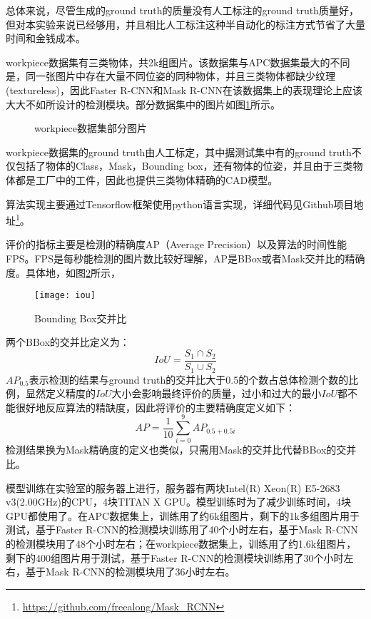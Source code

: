 总体来说，尽管生成的ground truth的质量没有人工标注的ground truth质量好，但对本实验来说已经够用，并且相比人工标注这种半自动化的标注方式节省了大量时间和金钱成本。

workpiece数据集有三类物体，共2k组图片。该数据集与APC数据集最大的不同是，同一张图片中存在大量不同位姿的同种物体，并且三类物体都缺少纹理(textureless)，因此Faster R-CNN和Mask R-CNN在该数据集上的表现理论上应该大大不如所设计的检测模块。部分数据集中的图片如图\ref{fig:wp_dataset}所示。
\begin{figure}[ht]
  \centering
  \hskip0.2cm
  \hskip0.2cm
  \vfill
  \hskip0.2cm
  \hskip0.2cm
  \caption{workpiece数据集部分图片}
  \label{fig:wp_dataset}
\end{figure}
workpiece数据集的ground truth由人工标定，其中据测试集中有的ground truth不仅包括了物体的Class，Mask，Bounding box，还有物体的位姿，并且由于三类物体都是工厂中的工件，因此也提供三类物体精确的CAD模型。

{\kai 算法实现}主要通过Tensorflow框架使用python语言实现，详细代码见Github项目地址\footnote{\url{https://github.com/freealong/Mask\_RCNN}}。

{\kai 评价的指标}主要是检测的精确度AP（Average Precision）以及算法的时间性能FPS。FPS是每秒能检测的图片数比较好理解，AP是BBox或者Mask交并比的精确度。具体地，如图\ref{fig:iou}所示，
\begin{figure}[ht]
  \centering
  \texttt{[image: iou]}
  \caption{Bounding Box交并比}
  \label{fig:iou}
\end{figure}
两个BBox的交并比定义为：
\begin{equation}
  IoU = \frac{S_1\cap S_2}{S_1\cup S_2}
\end{equation}
$AP_{0.5}$表示检测的结果与ground truth的交并比大于0.5的个数占总体检测个数的比例，显然定义精度的$IoU$大小会影响最终评价的质量，过小和过大的最小$IoU$都不能很好地反应算法的精缺度，因此将评价的主要精确度定义如下：
\begin{equation}
  AP = \frac{1}{10}\sum_{i=0}^{9}{AP_{0.5 + 0.5i}}
\end{equation}
检测结果换为Mask精确度的定义也类似，只需用Mask的交并比代替BBox的交并比。

{\kai 模型训练}在实验室的服务器上进行，服务器有两块Intel(R) Xeon(R) E5-2683 v3(2.00GHz)的CPU，4块TITAN X GPU。模型训练时为了减少训练时间，4块GPU都使用了。在APC数据集上，训练用了约6k组图片，剩下的1k多组图片用于测试，基于Faster R-CNN的检测模块训练用了40个小时左右，基于Mask R-CNN的检测模块用了48个小时左右；在workpiece数据集上，训练用了约1.6k组图片，剩下的400组图片用于测试，基于Faster R-CNN的检测模块训练用了30个小时左右，基于Mask R-CNN的检测模块用了36小时左右。

